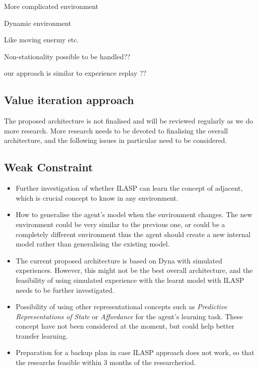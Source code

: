 \documentclass[12pt,twoside]{report}
\theoremstyle{plain}
\theoremstyle{definition}
\begin{document}
More complicated environment

Dynamic environment 

Like moving enermy etc.

Non-stationality possible to be handled??

our approach is similar to experience replay ??


\subsection{Value iteration approach}

The proposed architecture is not finalised and will be reviewed regularly as we do more research.
More research needs to be devoted to finalising the overall architecture, and the following issues in particular need to be considered.

\subsection{Weak Constraint}

\begin{itemize}

\item Further investigation of whether ILASP can learn the concept of adjacent, which is crucial concept to know in any environment.
\item How to generalise the agent's model when the environment changes. The new environment could be very similar to the previous one, or could be a completely different environment thus the agent should create a new internal model rather than generalising the existing model.
\item The current proposed architecture is based on Dyna with simulated experiences. However, this might not be the best overall architecture, and the feasibility of using simulated experience with the learnt model with ILASP needs to be further investigated.

\item Possibility of using other representational concepts such as \textit{Predictive Representations of State} or \textit{Affordance} \cite{Sridharan2017} for the agent's learning task. These concept have not been considered at the moment, but could help better transfer learning.

\item Preparation for a backup plan in case ILASP approach does not work, so that the researchs feasible within 3 months of the researcheriod.

\end{itemize}
\end{document}
